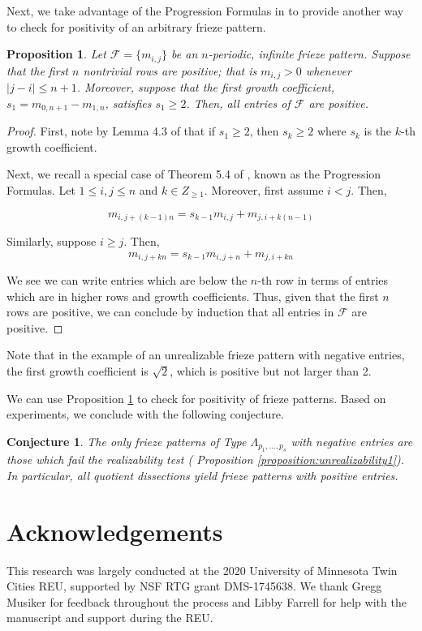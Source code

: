 \documentclass[12pt]{article}
\newtheorem{proposition}{Proposition}
\newtheorem{conjecture}{Conjecture}
\theoremstyle{remark}
\begin{document}
Next, we take advantage of the Progression Formulas in \cite{13} to provide another way to check for positivity of an arbitrary frieze pattern.

\begin{proposition}\label{prop:PositivityCheck}
Let $\mathcal{F} = \{m_{i,j}\}$ be an $n$-periodic, infinite frieze pattern. Suppose that the first $n$ nontrivial rows are positive; that is $m_{i,j} > 0$ whenever $\vert j - i\vert \leq n+1$. Moreover, suppose that the first growth coefficient, $s_1 = m_{0,n+1} - m_{1,n}$, satisfies $s_1 \geq 2$. Then, all entries of $\mathcal{F}$ are positive.
\end{proposition}
\begin{proof}
First, note by Lemma 4.3 of \cite{2} that if $s_1 \geq 2$, then $s_k \geq 2$ where $s_k$ is the $k$-th growth coefficient. 

Next, we recall a special case of Theorem 5.4 of \cite{13}, known as the Progression Formulas. Let $1 \leq i,j \leq n$ and $k \in Z_{\geq 1}$. Moreover, first assume $i < j$. Then,

\[
m_{i,j+(k-1)n} = s_{k-1}m_{i,j} + m_{j, i+k(n-1)}
\]

Similarly, suppose $i \geq j$. Then, \[
m_{i,j+kn} = s_{k-1}m_{i,j+n} + m_{j, i + kn}
\]

We see we can write entries which are below the $n$-th row in terms of entries which are in higher rows and growth coefficients. Thus, given that the first $n$ rows are positive, we can conclude by induction that all entries in $\mathcal{F}$ are positive. 

\end{proof}

Note that in the example of an unrealizable frieze pattern with negative entries, the first growth coefficient is $\sqrt{2}$, which is positive but not larger than 2. 

We can use Proposition \ref{prop:PositivityCheck} to check for positivity of frieze patterns. Based on experiments, we conclude with the following conjecture.

\begin{conjecture}\label{conj:Positive}
The only frieze patterns of Type $\Lambda_{p_1,\ldots,p_s}$ with negative entries are those which fail the realizability test ( Proposition \ref{proposition:unrealizability1}). In particular, all quotient dissections yield frieze patterns with positive entries. 
\end{conjecture}


\section{Acknowledgements}
This research was largely conducted at the 2020 University of Minnesota Twin Cities REU, supported by NSF RTG grant DMS-1745638. We thank Gregg Musiker for feedback throughout the process and Libby Farrell for help with the manuscript and support during the REU.
\end{document}

